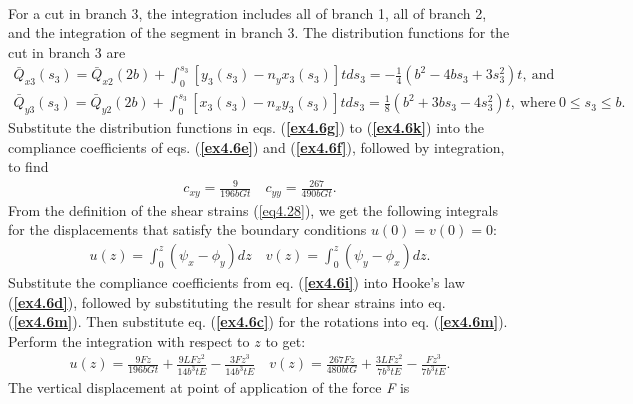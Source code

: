 \documentclass{AeroStructure-ERJohnson}
\begin{document}
\begin{example}
\begin{gather}
\end{gather}
For a cut in branch 3, the integration includes all of branch 1, all of branch 2, and the integration of the segment in branch 3. The distribution functions for the cut in branch 3\vspace*{-2pt} are
\begin{gather}
\bar{Q}_{x 3}\left(s_{3}\right)=\bar{Q}_{x 2}(2 b)+\int_{0}^{s_{3}}\left[y_{3}\left(s_{3}\right)-n_{y} x_{3}\left(s_{3}\right)\right] t d s_{3}=-\frac{1}{4}(b^{2}-4 b s_{3}+3 s_{3}^{2}) t,\ \text{and}\label{ex4.6j}\\
\bar{Q}_{y 3}\left(s_{3}\right)=\bar{Q}_{y 2}(2 b)+\int_{0}^{s_{3}}\left[x_{3}\left(s_{3}\right)-n_{x} y_{3}\left(s_{3}\right)\right] t d s_{3}=\frac{1}{8}(b^{2}+3 b s_{3}-4 s_{3}^{2}) t,\ \text{where}\ 0 \leq s_{3} \leq b.\label{ex4.6k}
\end{gather}
Substitute the distribution functions in eqs. (\textbf{\ref{ex4.6g}}) to (\textbf{\ref{ex4.6k}}) into the compliance coefficients of eqs. (\textbf{\ref{ex4.6e}}) and (\textbf{\ref{ex4.6f}}), followed by integration, to\vspace*{-2pt} find
\begin{align}
c_{x y}=\frac{9}{196 b G t} \quad c_{y y}=\frac{267}{490 b G t}.\label{ex4.6l}
\end{align}
From the definition of the shear strains (\ref{eq4.28}), we get the following integrals for the displacements that satisfy the boundary conditions $u(0)=v(0)=0$\vspace*{-2pt}:
\begin{align}\label{ex4.6m}
u(z)=\int_{0}^{z}\left(\psi_{x}-\phi_{y}\right) d z \quad v(z)=\int_{0}^{z}\left(\psi_{y}-\phi_{x}\right) d z.
\end{align}
Substitute the compliance coefficients from eq. (\textbf{\ref{ex4.6i}}) into Hooke's law (\textbf{\ref{ex4.6d}}), followed by substituting the result for shear strains into eq. (\textbf{\ref{ex4.6m}}). Then substitute eq. (\textbf{\ref{ex4.6c}}) for the rotations into eq. (\textbf{\ref{ex4.6m}}). Perform the integration with respect to $z$ to get\vspace*{-2pt}:
\begin{align}\label{ex4.6n}
u(z)=\frac{9 F z}{196 b G t}+\frac{9 L F z^{2}}{14 b^{3} t E}-\frac{3 F z^{3}}{14 b^{3} t E} \quad v(z)=\frac{267 F z}{480 b t G}+\frac{3 L F z^{2}}{7 b^{3} t E}-\frac{F z^{3}}{7 b^{3} t E}.
\end{align}
The vertical displacement at point of application of the force \textit{F}\vspace*{-2pt} is

\end{example}
\end{document}
